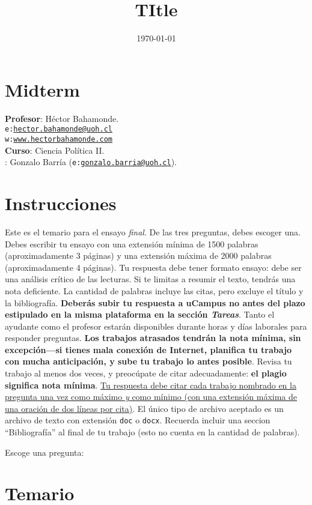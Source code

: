 \documentclass[onesided]{article}\usepackage[]{graphicx}\usepackage[]{color}
\title{TItle} %
\date{\today}
\begin{document}










\clearpage
\newpage
{}
\setcounter{page}{1}

\section{Midterm}

{\bf Profesor}: H\'ector Bahamonde.\\
\texttt{e:}\href{mailto:hector.bahamonde@uoh.cl}{\texttt{hector.bahamonde@uoh.cl}}\\
\texttt{w:}\href{http://www.hectorbahamonde.com}{\texttt{www.hectorbahamonde.com}}\\
{\bf Curso}: Ciencia Pol\'itica II.\\
\hspace{-5mm}{\bf Ayudante}: Gonzalo Barr\'ia (\texttt{e:}\href{mailto:gonzalo.barria@uoh.cl}{\texttt{gonzalo.barria@uoh.cl}}).

\section*{Instrucciones}
Este es el temario para el ensayo \emph{final}. De las tres preguntas, debes escoger una. Debes escribir tu ensayo con una extensi\'on m\'inima de 1500 palabras (aproximadamente 3 p\'aginas) y una extensi\'on m\'axima de 2000 palabras (aproximadamente 4 p\'aginas). Tu respuesta debe tener formato ensayo: debe ser una an\'alisis cr\'itico de las lecturas. Si te limitas a resumir el texto, tendr\'as una nota deficiente. La cantidad de palabras incluye las citas, pero excluye el t\'itulo y la bibliograf\'ia. {\bf Deber\'as subir tu respuesta a uCampus no antes del plazo estipulado en la misma plataforma en la secci\'on \emph{Tareas}}. Tanto el ayudante como el profesor estar\'an disponibles durante horas y d\'ias laborales para responder preguntas. {\bf Los trabajos atrasados tendr\'an la nota m\'inima, sin excepci\'on---si tienes mala conexi\'on de Internet, planifica tu trabajo con mucha anticipaci\'on, y sube tu trabajo lo antes posible}. Revisa tu trabajo al menos dos veces, y preoc\'upate de citar adecuadamente: {\bf el plagio significa nota m\'inima}. \ul{Tu respuesta debe citar cada trabajo nombrado en la pregunta una vez como m\'aximo \emph{y} como m\'inimo (con una extensi\'on m\'axima de una oraci\'on de dos l\'ineas por cita)}. El \'unico tipo de archivo aceptado es un archivo de texto con extensi\'on \texttt{doc} o \texttt{docx}. Recuerda incluir una seccion ``Bibliograf\'ia'' al final de tu trabajo (esto no cuenta en la cantidad de palabras).

Escoge una pregunta:

\section*{Temario}



\newpage
{}
\setcounter{page}{1}
\printbibliography
\end{document}
